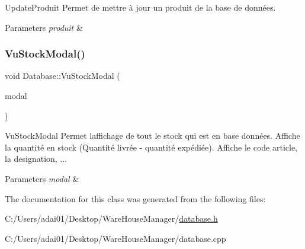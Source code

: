 Update\+Produit Permet de mettre à jour un produit de la base de données. 


\begin{DoxyParams}{Parameters}
{\em produit} & \\
\hline
\end{DoxyParams}
\mbox{\label{class_database_aa27438ff72eb9d7b314538fe01808ba6}} 
\subsubsection{\texorpdfstring{Vu\+Stock\+Modal()}{VuStockModal()}}
{\footnotesize\ttfamily void Database\+::\+Vu\+Stock\+Modal (\begin{DoxyParamCaption}\item[{Q\+Sql\+Query\+Model $\ast$}]{modal }\end{DoxyParamCaption})}



Vu\+Stock\+Modal Permet l\textquotesingle{}affichage de tout le stock qui est en base données. Affiche la quantité en stock (Quantité livrée -\/ quantité expédiée). Affiche le code article, la designation, ... 


\begin{DoxyParams}{Parameters}
{\em modal} & \\
\hline
\end{DoxyParams}


The documentation for this class was generated from the following files\+:\begin{DoxyCompactItemize}
\item 
C\+:/\+Users/adai01/\+Desktop/\+Ware\+House\+Manager/\mbox{\hyperlink{database_8h}{database.\+h}}\item 
C\+:/\+Users/adai01/\+Desktop/\+Ware\+House\+Manager/database.\+cpp\end{DoxyCompactItemize}
